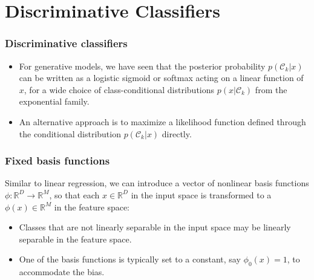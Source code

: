 \documentclass{beamer}
\begin{document}
\section{Discriminative Classifiers}

\begin{frame}
    \frametitle{Discriminative classifiers}
    \begin{itemize}
        \item For generative models, we have seen that the posterior probability $p(\mathcal{C}_{k}|x)$ can be written as a logistic sigmoid or softmax acting on a linear function of $x$, for a wide choice of class-conditional distributions $p(x|\mathcal{C}_{k})$ from the exponential family.
        \item An alternative approach is to maximize a likelihood function defined through the conditional distribution $p(\mathcal{C}_{k}|x)$ directly.
    \end{itemize}
\end{frame}

\begin{frame}
    \frametitle{Fixed basis functions}
    Similar to linear regression, we can introduce a vector of nonlinear basis functions $\phi: \mathbb{R}^{D}\to\mathbb{R}^{M}$, so that each $x\in\mathbb{R}^{D}$ in the input space is transformed to a $\phi(x)\in\mathbb{R}^{M}$ in the feature space:
    \begin{itemize}
        \item Classes that are not linearly separable in the input space may be linearly separable in the feature space.
        \item One of the basis functions is typically set to a constant, say $\phi_{0}(x)=1$, to accommodate the bias.
    \end{itemize}
\end{frame}
\end{document}
